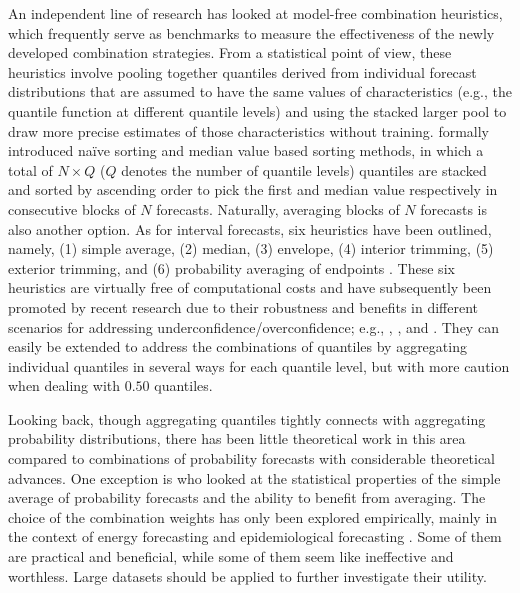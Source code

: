 \documentclass[11pt]{article}
\begin{document}
An independent line of research has looked at model-free combination heuristics, which frequently serve as benchmarks to measure the effectiveness of the newly developed combination strategies. From a statistical point of view, these heuristics involve pooling together quantiles derived from individual forecast distributions that are assumed to have the same values of characteristics (e.g., the quantile function at different quantile levels) and using the stacked larger pool to draw more precise estimates of those characteristics without training. \citet{Wang2019-lx} formally introduced na\"{i}ve sorting and median value based sorting methods, in which a total of $N \times Q$ ($Q$ denotes the number of quantile levels) quantiles are stacked and sorted by ascending order to pick the first and median value respectively in consecutive blocks of $N$ forecasts. Naturally, averaging blocks of $N$ forecasts is also another option. As for interval forecasts, six heuristics have been outlined, namely, (1) simple average, (2) median, (3) envelope, (4) interior trimming, (5) exterior trimming, and (6) probability averaging of endpoints \citep{Park2015-zn,Gaba2017-om}. These six heuristics are virtually free of computational costs and have subsequently been promoted by recent research due to their robustness and benefits in different scenarios for addressing underconfidence/overconfidence; e.g., \citet{Smyl2019-av}, \citet{Petropoulos2020-fp}, and \citet{Grushka-Cockayne2020-qv}. They can easily be extended to address the combinations of quantiles by aggregating individual quantiles in several ways for each quantile level, but with more caution when dealing with $0.50$ quantiles.

Looking back, though aggregating quantiles tightly connects with aggregating probability distributions, there has been little theoretical work in this area compared to combinations of probability forecasts with considerable theoretical advances. One exception is \citet{Lichtendahl2013-rt} who looked at the statistical properties of the simple average of probability forecasts and the ability to benefit from averaging. The choice of the combination weights has only been explored empirically, mainly in the context of energy forecasting \citep[e.g.,][]{Wang2019-lx,Browell2020-pa} and epidemiological forecasting \citep[e.g.,][]{Brooks2020-sg,Ray2020-qg}. Some of them are practical and beneficial, while some of them seem like ineffective and worthless. Large datasets should be applied to further investigate their utility.
\end{document}
